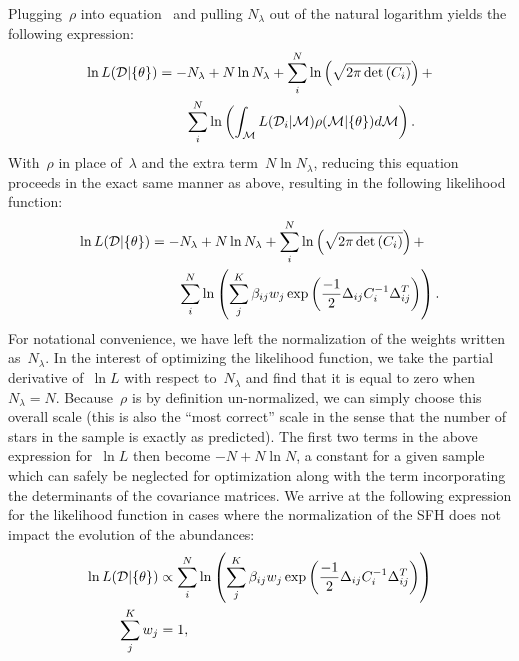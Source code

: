 Plugging~$\rho$ into equation~ and pulling
$N_\lambda$ out of the natural logarithm yields the following expression:
\begin{equation}\begin{split}
\ln L(\mathcal{D} | \{\theta\}) &= -N_\lambda + N \ln N_\lambda +
\sum_i^N \ln \left(\sqrt{2\pi \det{(C_i)}}\right) +
\\
&\qquad \sum_i^N \ln \left(
\int_{\mathcal{M}} L(\mathcal{D}_i | \mathcal{M}) \rho(\mathcal{M} | \{\theta\})
d\mathcal{M} \right).
\end{split}\end{equation}
With~$\rho$ in place of~$\lambda$ and the extra term~$N \ln N_\lambda$,
reducing this equation proceeds in the exact same manner as above, resulting
in the following likelihood function:
\begin{equation}\begin{split}
\ln L(\mathcal{D} | \{\theta\}) &= -N_\lambda + N \ln N_\lambda +
\sum_i^N \ln \left(\sqrt{2\pi \det{(C_i)}}\right) +
\\
&\qquad \sum_i^N \ln \left(
\sum_j^K \beta_{ij} w_j
\exp\left(\frac{-1}{2}\Delta_{ij} C_i^{-1} \Delta_{ij}^T\right)\right).
\end{split}\end{equation}
For notational convenience, we have left the normalization of the weights
written as~$N_\lambda$.
In the interest of optimizing the likelihood function, we take the partial
derivative of~$\ln L$ with respect to~$N_\lambda$ and find that it is equal to
zero when~$N_\lambda = N$.
Because~$\rho$ is by definition un-normalized, we can simply choose this
overall scale (this is also the ``most correct'' scale in the sense that the
number of stars in the sample is exactly as predicted).
The first two terms in the above expression for~$\ln L$ then become
$-N + N \ln N$, a constant for a given sample which can safely be neglected
for optimization along with the term incorporating the determinants of the
covariance matrices.
We arrive at the following expression for the likelihood function in cases
where the normalization of the SFH does not impact the evolution of the
abundances:
\begin{subequations}\begin{align}
\ln L(\mathcal{D} | \{\theta\}) &\propto \sum_i^N \ln \left( \sum_j^K \beta_{ij}
w_j \exp\left(\frac{-1}{2}\Delta_{ij} C_i^{-1} \Delta_{ij}^T\right) \right)
\label{dga:eq:lnL_fracweight}
\\
\sum_j^K w_j &= 1,
\label{dga:eq:lnL_fracweightsum}
\end{align}\end{subequations}
